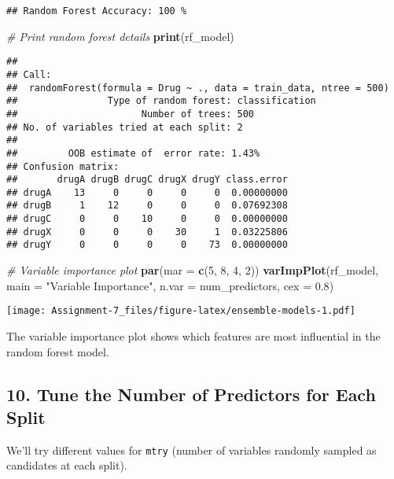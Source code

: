 \documentclass[
]{article}
\newenvironment{Shaded}{\begin{snugshade}}{\end{snugshade}}
\newcommand{\AttributeTok}[1]{\textcolor[rgb]{0.13,0.29,0.53}{#1}}
\newcommand{\CommentTok}[1]{\textcolor[rgb]{0.56,0.35,0.01}{\textit{#1}}}
\newcommand{\DecValTok}[1]{\textcolor[rgb]{0.00,0.00,0.81}{#1}}
\newcommand{\FloatTok}[1]{\textcolor[rgb]{0.00,0.00,0.81}{#1}}
\newcommand{\FunctionTok}[1]{\textcolor[rgb]{0.13,0.29,0.53}{\textbf{#1}}}
\newcommand{\NormalTok}[1]{#1}
\newcommand{\StringTok}[1]{\textcolor[rgb]{0.31,0.60,0.02}{#1}}
\begin{document}
\begin{verbatim}
## Random Forest Accuracy: 100 %
\end{verbatim}

\begin{Shaded}
\begin{Highlighting}[]
\CommentTok{\# Print random forest details}
\FunctionTok{print}\NormalTok{(rf\_model)}
\end{Highlighting}
\end{Shaded}

\begin{verbatim}
## 
## Call:
##  randomForest(formula = Drug ~ ., data = train_data, ntree = 500) 
##                Type of random forest: classification
##                      Number of trees: 500
## No. of variables tried at each split: 2
## 
##         OOB estimate of  error rate: 1.43%
## Confusion matrix:
##       drugA drugB drugC drugX drugY class.error
## drugA    13     0     0     0     0  0.00000000
## drugB     1    12     0     0     0  0.07692308
## drugC     0     0    10     0     0  0.00000000
## drugX     0     0     0    30     1  0.03225806
## drugY     0     0     0     0    73  0.00000000
\end{verbatim}

\begin{Shaded}
\begin{Highlighting}[]
\CommentTok{\# Variable importance plot}
\FunctionTok{par}\NormalTok{(}\AttributeTok{mar =} \FunctionTok{c}\NormalTok{(}\DecValTok{5}\NormalTok{, }\DecValTok{8}\NormalTok{, }\DecValTok{4}\NormalTok{, }\DecValTok{2}\NormalTok{))}
\FunctionTok{varImpPlot}\NormalTok{(rf\_model, }\AttributeTok{main =} \StringTok{"Variable Importance"}\NormalTok{, }\AttributeTok{n.var =}\NormalTok{ num\_predictors, }\AttributeTok{cex =} \FloatTok{0.8}\NormalTok{)}
\end{Highlighting}
\end{Shaded}

\texttt{[image: Assignment-7\_files/figure-latex/ensemble-models-1.pdf]}

The variable importance plot shows which features are most influential
in the random forest model.

\subsection{10. Tune the Number of Predictors for Each
Split}\label{tune-the-number-of-predictors-for-each-split}

We'll try different values for \texttt{mtry} (number of variables
randomly sampled as candidates at each split).
\end{document}
